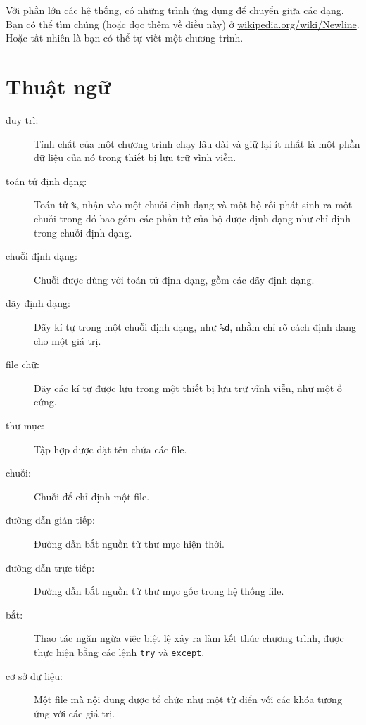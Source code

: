 \documentclass[11pt]{book}
\begin{document}

Với phần lớn các hệ thống, có những trình ứng dụng để chuyển
giữa các dạng. Bạn có thể tìm chúng (hoặc đọc thêm về điều này)
ở \url{wikipedia.org/wiki/Newline}.  Hoặc tất nhiên là bạn có thể
tự viết một chương trình.


\section{Thuật ngữ}

\begin{description}

\item[duy trì:] Tính chất của một chương trình chạy lâu dài và
giữ lại ít nhất là một phần dữ liệu của nó trong thiết bị lưu trữ
vĩnh viễn.

\item[toán tử định dạng:] Toán tử {\tt \%}, nhận vào một chuỗi
định dạng và một bộ rồi phát sinh ra một chuỗi trong đó bao gồm
các phần tử của bộ được định dạng như chỉ định trong chuỗi
định dạng.

\item[chuỗi định dạng:] Chuỗi được dùng với toán tử định dạng,
gồm các dãy định dạng.

\item[dãy định dạng:] Dãy kí tự trong một  chuỗi định dạng,
như {\tt \%d}, nhằm chỉ rõ cách định dạng cho một giá trị.

\item[file chữ:] Dãy các kí tự được lưu trong một thiết bị lưu trữ vĩnh viễn, 
như một ổ cứng.

\item[thư mục:] Tập hợp được đặt tên chứa các file.

\item[chuỗi:] Chuỗi để chỉ định một file.

\item[đường dẫn gián tiếp:] Đường dẫn bắt nguồn từ thư mục hiện thời.

\item[đường dẫn trực tiếp:] Đường dẫn bắt nguồn từ thư mục gốc 
trong hệ thống file.

\item[bắt:] Thao tác ngăn ngừa việc biệt lệ xảy ra làm kết thúc chương trình,
được thực hiện bằng các lệnh {\tt try} và {\tt except}.

\item[cơ sở dữ liệu:] Một file mà nội dung được tổ chức như một từ điển
với các khóa tương ứng với các giá trị.

\end{description}
\end{document}
